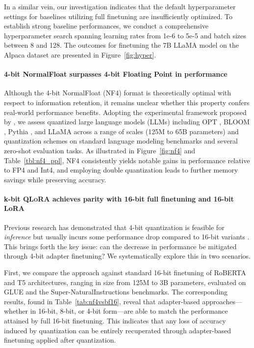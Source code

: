 In a similar vein, our investigation indicates that the default hyperparameter settings for baselines utilizing full finetuning are insufficiently optimized. To establish strong baseline performances, we conduct a comprehensive hyperparameter search spanning learning rates from 1e-6 to 5e-5 and batch sizes between 8 and 128. The outcomes for finetuning the 7B LLaMA model on the Alpaca dataset are presented in Figure~\ref{fig:hyper}.

\paragraph{4-bit NormalFloat surpasses 4-bit Floating Point in performance} 

Although the 4-bit NormalFloat (NF4) format is theoretically optimal with respect to information retention, it remains unclear whether this property confers real-world performance benefits. Adopting the experimental framework proposed by \citet{dettmers2022case}, we assess quantized large language models (LLMs) including OPT \citep{zhang2022opt}, BLOOM \cite{scao2022bloom}, Pythia \cite{biderman2023pythia}, and LLaMA across a range of scales (125M to 65B parameters) and quantization schemes on standard language modeling benchmarks and several zero-shot evaluation tasks. As illustrated in Figure~\ref{fig:nf4} and Table~\ref{tbl:nf4_ppl}, NF4 consistently yields notable gains in performance relative to FP4 and Int4, and employing double quantization leads to further memory savings while preserving accuracy.

\paragraph{k-bit \textsc{QLoRA} achieves parity with 16-bit full finetuning and 16-bit LoRA} Previous research has demonstrated that 4-bit quantization is feasible for \emph{inference} but usually incurs some performance drop compared to 16-bit variants \citep{dettmers2022case,frantar2022gptq}. This brings forth the key issue: can the decrease in performance be mitigated through 4-bit adapter finetuning? We systematically explore this in two scenarios.

First, we compare the approach against standard 16-bit finetuning of RoBERTA and T5 architectures, ranging in size from 125M to 3B parameters, evaluated on GLUE and the Super-NaturalInstructions benchmarks. The corresponding results, found in Table~\ref{tab:nf4vsbf16}, reveal that adapter-based approaches—whether in 16-bit, 8-bit, or 4-bit form—are able to match the performance attained by full 16-bit finetuning. This indicates that any loss of accuracy induced by quantization can be entirely recuperated through adapter-based finetuning applied after quantization.

